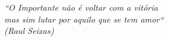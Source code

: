 \documentclass[../../layout.tex]{subfiles}
\begin{document}
\begin{epigrafe}
\vspace*{\fill}

\begin{flushright}
\textit{``O Importante não é voltar com a vitória\\
	mas sim lutar por aquilo que se tem amor``\\
	(Raul Seixas)
}
\end{flushright}

\end{epigrafe}
\end{document}

